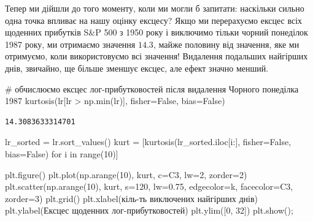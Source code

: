 \documentclass[
  letterpaper,
]{report}
\newenvironment{Shaded}{\begin{snugshade}}{\end{snugshade}}
\newcommand{\BuiltInTok}[1]{\textcolor[rgb]{0.00,0.23,0.31}{#1}}
\newcommand{\CommentTok}[1]{\textcolor[rgb]{0.37,0.37,0.37}{#1}}
\newcommand{\ControlFlowTok}[1]{\textcolor[rgb]{0.00,0.23,0.31}{#1}}
\newcommand{\DecValTok}[1]{\textcolor[rgb]{0.68,0.00,0.00}{#1}}
\newcommand{\FloatTok}[1]{\textcolor[rgb]{0.68,0.00,0.00}{#1}}
\newcommand{\KeywordTok}[1]{\textcolor[rgb]{0.00,0.23,0.31}{#1}}
\newcommand{\NormalTok}[1]{\textcolor[rgb]{0.00,0.23,0.31}{#1}}
\newcommand{\OperatorTok}[1]{\textcolor[rgb]{0.37,0.37,0.37}{#1}}
\newcommand{\StringTok}[1]{\textcolor[rgb]{0.13,0.47,0.30}{#1}}
\newcommand{\VariableTok}[1]{\textcolor[rgb]{0.07,0.07,0.07}{#1}}
\begin{document}
Тепер ми дійшли до того моменту, коли ми могли б запитати: наскільки
сильно одна точка впливає на нашу оцінку ексцесу? Якщо ми перерахуємо
ексцес всіх щоденних прибутків S\&P 500 з 1950 року і виключимо тільки
чорний понеділок 1987 року, ми отримаємо значення \(14.3\), майже
половину від значення, яке ми отримуємо, коли використовуємо всі
значення! Видалення подальших найгірших днів, звичайно, ще більше
зменшує ексцес, але ефект значно менший.

\begin{Shaded}
\begin{Highlighting}[]
\CommentTok{\# обчислюємо ексцес лог{-}прибутковостей після видалення Чорного понеділка 1987}
\NormalTok{kurtosis(lr[lr }\OperatorTok{\textgreater{}}\NormalTok{ np.}\BuiltInTok{min}\NormalTok{(lr)], fisher}\OperatorTok{=}\VariableTok{False}\NormalTok{, bias}\OperatorTok{=}\VariableTok{False}\NormalTok{)}
\end{Highlighting}
\end{Shaded}

\begin{verbatim}
14.3083633314701
\end{verbatim}

\begin{Shaded}
\begin{Highlighting}[]
\NormalTok{lr\_sorted }\OperatorTok{=}\NormalTok{ lr.sort\_values()}
\NormalTok{kurt }\OperatorTok{=}\NormalTok{ [kurtosis(lr\_sorted.iloc[i:], fisher}\OperatorTok{=}\VariableTok{False}\NormalTok{, bias}\OperatorTok{=}\VariableTok{False}\NormalTok{) }\ControlFlowTok{for}\NormalTok{ i }\KeywordTok{in} \BuiltInTok{range}\NormalTok{(}\DecValTok{10}\NormalTok{)]}

\NormalTok{plt.figure()}
\NormalTok{plt.plot(np.arange(}\DecValTok{10}\NormalTok{), kurt, c}\OperatorTok{=}\StringTok{\textquotesingle{}C3\textquotesingle{}}\NormalTok{, lw}\OperatorTok{=}\DecValTok{2}\NormalTok{, zorder}\OperatorTok{=}\DecValTok{2}\NormalTok{)}
\NormalTok{plt.scatter(np.arange(}\DecValTok{10}\NormalTok{), kurt, s}\OperatorTok{=}\DecValTok{120}\NormalTok{, lw}\OperatorTok{=}\FloatTok{0.75}\NormalTok{, edgecolor}\OperatorTok{=}\StringTok{\textquotesingle{}k\textquotesingle{}}\NormalTok{, facecolor}\OperatorTok{=}\StringTok{\textquotesingle{}C3\textquotesingle{}}\NormalTok{, zorder}\OperatorTok{=}\DecValTok{3}\NormalTok{)}
\NormalTok{plt.grid()}
\NormalTok{plt.xlabel(}\StringTok{\textquotesingle{}кіль{-}ть виключених найгірших днів\textquotesingle{}}\NormalTok{)}
\NormalTok{plt.ylabel(}\StringTok{\textquotesingle{}Ексцес щоденних лог{-}прибутковостей\textquotesingle{}}\NormalTok{)}
\NormalTok{plt.ylim([}\DecValTok{0}\NormalTok{, }\DecValTok{32}\NormalTok{])}
\NormalTok{plt.show()}\OperatorTok{;}
\end{Highlighting}
\end{Shaded}
\end{document}
